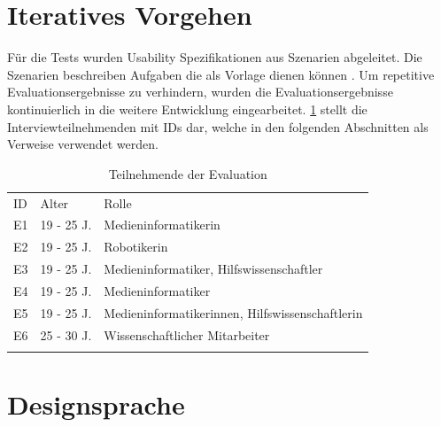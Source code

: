 \section{Iteratives Vorgehen}
Für die Tests wurden Usability Spezifikationen aus Szenarien abgeleitet. Die Szenarien beschreiben
Aufgaben die als Vorlage dienen können . Um repetitive Evaluationsergebnisse zu verhindern, wurden
die Evaluationsergebnisse kontinuierlich in die weitere Entwicklung eingearbeitet. \ref{table:e}
stellt die Interviewteilnehmenden  mit IDs dar, welche in den folgenden Abschnitten als Verweise
verwendet werden.

\begin{table}[h]
    \centering
    \caption{Teilnehmende der Evaluation}
    \begin{tabular}{lll}
            \arrayrulecolor{maincolor}\hline
            \sffamily\color{maincolor}ID & \sffamily\color{maincolor}Alter &
            \sffamily\color{maincolor}Rolle \\
            \arrayrulecolor{maincolor}\hline
            E1                           & 19 - 25 J.                      &
            Medieninformatikerin                     \\
            E2                           & 19 - 25 J.                      & Robotikerin \\
            E3                           & 19 - 25 J.                      & Medieninformatiker, Hilfswissenschaftler        \\
            E4                          & 19 - 25 J.                      & Medieninformatiker \\
            E5                           & 19 - 25 J.                      &
            Medieninformatikerinnen, Hilfswissenschaftlerin \\
            E6                           & 25 - 30 J.                      & Wissenschaftlicher Mitarbeiter        \\
            \arrayrulecolor{maincolor}\hline
    \end{tabular}
    \label{table:e}
\end{table}

\section{Designsprache}


